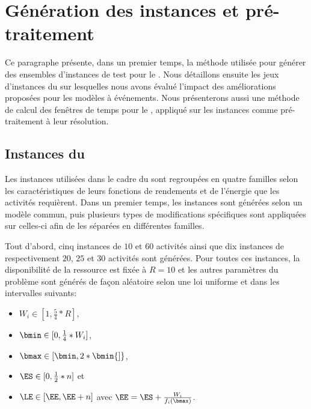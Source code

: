 \section{Génération des instances et pré-traitement}
\label{sec:instance}
Ce paragraphe présente, dans un premier temps, la méthode utilisée
pour générer des ensembles d'instances de test pour le \CECSP. Nous
détaillons ensuite les jeux d'instances du \RCPSP sur lesquelles nous
avons évalué l'impact des améliorations proposées pour les modèles à
événements. Nous présenterons aussi une méthode de calcul des fenêtres
de temps pour le \RCPSP, appliqué sur les instances comme
pré-traitement à leur résolution.

\subsection{Instances du \CECSP}
\label{sec:instance_CECSP}
Les instances utilisées dans le cadre du \CECSP sont regroupées en
quatre familles selon les caractéristiques de leurs fonctions de
rendements et de l'énergie que les activités requièrent. Dans un
premier temps, les instances sont générées selon un modèle commun,
puis plusieurs types de modifications spécifiques sont appliquées sur
celles-ci afin de les séparées en différentes familles. 

Tout d'abord, cinq instances de $10$ et $60$ activités ainsi que dix
instances de respectivement $20$, $25$ et $30$ activités sont
générées. Pour toutes ces instances, la disponibilité de la ressource
est fixée à $R=10$ et les autres paramètres du problème sont générés
de façon aléatoire selon une loi uniforme et dans les intervalles
suivants:
\begin{itemize}
\item $W_i \in [1 , \frac{5}{4} * R]$,
\item $\bmin \in [0, \frac{1}{4} * W_i]$,
\item $\bmax \in [\bmin , 2 * \bmin {]}$,
\item $\ES \in [0,\frac{1}{2}*n]$ et
\item $\LE \in [ \EE, \EE + n ]$ avec $\EE = \ES +
\frac{W_i}{f_i(\bmax)}$.
\end{itemize}

